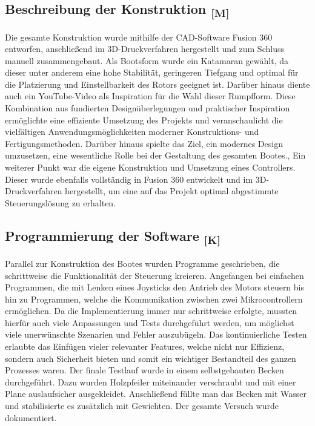 \documentclass[a4paper,12pt]{article}
\begin{document}
\subsection*{\texorpdfstring{Beschreibung der Konstruktion \textsubscript{[M]}}{Beschreibung der Konstruktion [M]}}
Die gesamte Konstruktion wurde mithilfe der CAD-Software Fusion 360 entworfen, anschließend im 3D-Druckverfahren hergestellt und zum Schluss manuell zusammengebaut. Als Bootsform wurde ein Katamaran gewählt, da dieser unter anderem eine hohe Stabilität, geringeren Tiefgang und optimal für die Platzierung und Einstellbarkeit des Rotors 
geeignet ist. Darüber hinaus diente auch ein YouTube-Video als Inspiration für die Wahl dieser Rumpfform. Diese Kombination aus fundierten Designüberlegungen und praktischer Inspiration ermöglichte eine effiziente Umsetzung des Projekts und veranschaulicht die vielfältigen Anwendungsmöglichkeiten moderner Konstruktions- und Fertigungsmethoden. Darüber hinaus spielte das Ziel, ein modernes Design umzusetzen, eine wesentliche Rolle bei der Gestaltung des gesamten Bootes.\cite{Website:Youtube}, \newline
Ein weiterer Punkt war die eigene Konstruktion und Umsetzung eines Controllers. Dieser wurde ebenfalls vollständig in Fusion 360 entwickelt und im 3D-Druckverfahren hergestellt, um eine auf das Projekt optimal abgestimmte Steuerungslösung zu erhalten.
\subsection*{\texorpdfstring{Programmierung der Software \textsubscript{[K]}}{Programmierung der Software [K]}}
Parallel zur Konstruktion des Bootes wurden Programme geschrieben, die schrittweise die Funktionalität der Steuerung kreieren. Angefangen bei einfachen Programmen, die mit Lenken eines Joysticks den Antrieb des Motors steuern bis hin zu Programmen, welche die Kommunikation zwischen zwei Mikrocontrollern ermöglichen. Da die Implementierung immer nur schrittweise erfolgte, mussten hierfür auch viele Anpassungen und Tests durchgeführt werden, um möglichst viele unerwünschte Szenarien und Fehler auszubügeln. Das kontinuierliche Testen erlaubte das Einfügen vieler relevanter Features, welche nicht nur Effizienz, sondern auch Sicherheit bieten und somit ein wichtiger Bestandteil des ganzen Prozesses waren. 
Der finale Testlauf wurde in einem selbstgebauten Becken durchgeführt. Dazu wurden Holzpfeiler miteinander verschraubt und mit einer Plane auslaufsicher ausgekleidet. Anschließend füllte man das Becken mit Wasser und stabilisierte es zusätzlich mit Gewichten. Der gesamte Versuch wurde dokumentiert.
\newpage
\end{document}
